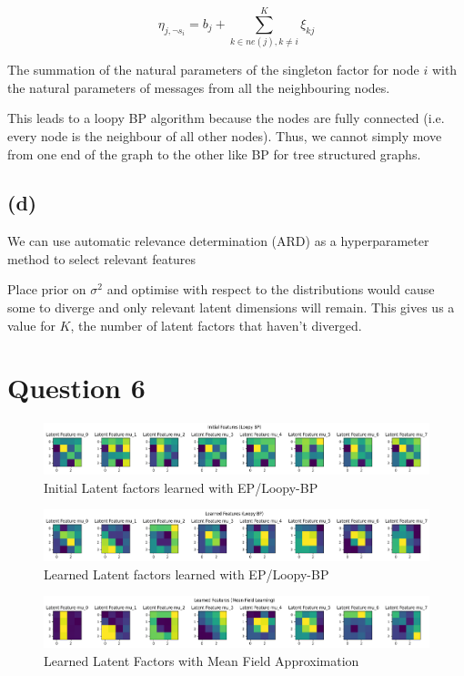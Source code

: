 \documentclass[12pt]{article}
\begin{document}
\[\eta_{j, \neg s_i} =  b_j + \sum_{k\in ne(j), k\neq i}^{K} \xi_{kj}\]


The summation of the natural parameters of the singleton factor for node $i$ with the natural parameters of messages from all the neighbouring nodes.

This leads to a loopy BP algorithm because the nodes are fully connected (i.e. every node is the neighbour of all other nodes). Thus, we cannot simply move from one end of the graph to the other like BP for tree structured graphs.

\subsection*{(d)}

We can use automatic relevance determination (ARD) as a hyperparameter method to select relevant features

Place prior on $\sigma^2$ and optimise with respect to the distributions would cause some to diverge and only relevant latent dimensions will remain.
This gives us a value for $K$, the number of latent factors that haven't diverged.


\newpage
\section*{Question 6}

\begin{figure}[h]
\centering
\includegraphics[scale=0.4]{outputs/q6/all-init-latent-factors}
\caption{Initial Latent factors learned with EP/Loopy-BP}
\label{fig:6-init-latent-factors}
\end{figure}

\begin{figure}[h]
\centering
\includegraphics[scale=0.4]{outputs/q6/all-latent-factors}
\caption{Learned Latent factors learned with EP/Loopy-BP}
\label{fig:6-latent-factors}
\end{figure}

\begin{figure}[h]
\centering
\includegraphics[scale=0.4]{outputs/q3/f-latent-factors}
\caption{Learned Latent Factors with Mean Field Approximation}
\label{fig:3f-latent-factors}
\end{figure}
\end{document}
